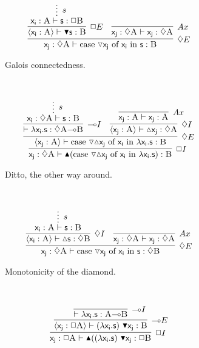 \begin{figure}
	\begin{subfigure}{1\textwidth}
		\[
			\infer[\diamond E]{\term{x_j}: \diamond \prop{A} \vdash \caseof{\diaelim x_j}{x_i}{s}:\prop{B}}{
				\infer[\Box E]{\bracket{\term{x_i}: \prop{A}} \vdash \boxelim\term{s}: \prop{B}}{
					\infer*[s]{\term{x_i}: \prop{A} \vdash \term{s}: \Box\prop{B}}{}
				}
				&
				\infer[Ax]{\term{x_j}: \diamond \prop{A} \vdash \term{x_j}: \diamond \prop{A}}{}
			}
		\]
	\caption{Galois connectedness.}
	\label{subfigure:modal_properties:galois1}	
	\end{subfigure}\\[\midsep]
	\begin{subfigure}{1\textwidth}
		\[
			\infer[\Box I]{\term{x_j}: \diamond \prop{A} \vdash \boxintro(\caseof{\diaelim \diaintro x_j}{x_i}{\lambda x_i.s}): \prop{B}}{
				\infer[\diamond E]{\bracket{\term{x_j}: \prop{A}} \vdash \caseof{\diaelim \diaintro x_j}{x_i}{\lambda x_i.s}: \prop{B}}{
					\infer[\li I]{\vdash \term{\lambda x_i.s}: \diamond\prop{A} \li \prop{B}}{
						\infer*[s]{\term{x_i}: \diamond\prop{A} \vdash \term{s}: \prop{B}}{}
					}
					&
					\infer[\diamond I]{\bracket{\term{x_j}: \prop{A}} \vdash \term{\diaintro x_j}: \diamond \prop{A}}{
						\infer[Ax]{\term{x_j}: \prop{A} \vdash \term{x_j}: \prop{A}}{}
					}
				}
			}
		\]
	\caption{Ditto, the other way around.}
	\label{subfigure:modal_properties:galois2}	
	\end{subfigure}\\[\midsep]
	\begin{subfigure}{1\textwidth}
		\[
			\infer[\diamond E]{\term{x_j}: \diamond \prop{A} \vdash  \cterm{case \term{\diaelim x_j} of \term{x_i} in \term{s}}: \diamond \prop{B}}{
					\infer[\diamond I]{\bracket{\term{x_i}: \prop{A}} \vdash \diaintro \term{s}: \diamond \prop{B}}{
						\infer*[s]{\term{x_i}: \prop{A} \vdash \term{s}: \prop{B}}{}
					}
					&
					\infer[Ax]{\term{x_j}: \diamond \prop{A} \vdash \term{x_j}: \diamond \prop{A}}{}
			}
		\]
	\caption{Monotonicity of the diamond.}
	\label{subfigure:modal_properties:diamond_mono}
	\end{subfigure}\\[\midsep]
	\begin{subfigure}{1\textwidth}
		\[
			\infer[\Box I]{\term{x_j}: \Box \prop{A} \vdash \boxintro{((\term{\lambda x_i.s})~\term{\boxelim x_j}}:\Box \prop{B}}{
				\infer[\li E]{\bracket{\term{x_j}: \Box \prop{A}} \vdash (\term{\lambda x_i.s})~\term{\boxelim x_j}: \prop{B}}{
					\infer[\li I]{\vdash \term{\lambda x_i.s}: \prop{A} \li\prop{B}}{
}}}\]
\end{subfigure}
\end{figure}
